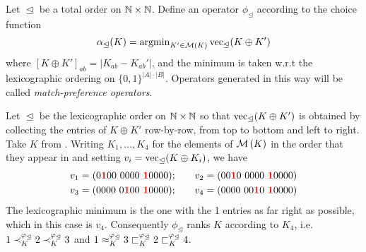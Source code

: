 \begin{definition}%
   \label{tourn_def_matchpref_operator}

    Let $\trianglelefteq$ be a total order on $\mathbb{N} \times \mathbb{N}$. Define an
    operator $\phi_{\trianglelefteq}$ according to the choice function
    \begin{equation}
        \label{tourn_eqn_match_preference_alpha_definition}
        \alpha_{\trianglelefteq}(K)
        = \operatorname{argmin}_{K' \in \operatorname{\mathcal{M}}\left({K}\right)}{
            \operatorname{vec}_{\trianglelefteq}(K \oplus K')
        }
    \end{equation}
    where $[K \oplus K']_{ab} = |K_{ab} - K_{ab}'|$, and the minimum is taken
    w.r.t the lexicographic ordering on $\{0,1\}^{|A| \cdot
    |B|}$.\footnotemark{} Operators generated in this way will be called
    \emph{match-preference operators}.

\end{definition}


\begin{example}
    \label{tourn_ex_match_preference_example}

    Let $\trianglelefteq$ be the lexicographic order\footnotemark{} on $\mathbb{N}
    \times \mathbb{N}$ so that $\operatorname{vec}_{\trianglelefteq}(K \oplus K')$ is obtained by
    collecting the entries of $K \oplus K'$ row-by-row, from top to
    bottom and left to right.
    Take $K$ from . Writing $K_1,\ldots,K_4$ for the elements of
    $\operatorname{\mathcal{M}}\left({K}\right)$ in the order that they appear in  and setting
    $v_i = \operatorname{vec}_{\trianglelefteq}(K \oplus K_i)$, we have
    \begin{align*}
        v_1 = (0\bm{{\color{red}1}}00\ 0000\ \bm{{\color{red}1}}0000);
        & \quad \quad
        v_2 = (00\bm{{\color{red}1}}0\ 0000\ \bm{{\color{red}1}}0000) \\
        v_3 = (0000\ 0\bm{{\color{red}1}}00\ \bm{{\color{red}1}}0000);
        & \quad \quad
        v_4 = (0000\ 00\bm{{\color{red}1}}0\ \bm{{\color{red}1}}0000)
    \end{align*}
    The lexicographic minimum is the one with the 1 entries as far right as
    possible, which in this case is $v_4$. Consequently
    $\phi_{\trianglelefteq}$ ranks $K$ according to $K_4$, i.e. $1
    \prec_K^{\varphi_{\trianglelefteq}} 2 \prec_K^{\varphi_{\trianglelefteq}} 3$ and $1
    \approx_K^{\varphi_{\trianglelefteq}} 3 \sqsubset_K^{\varphi_{\trianglelefteq}} 2
    \sqsubset_K^{\varphi_{\trianglelefteq}} 4$.

\end{example}

